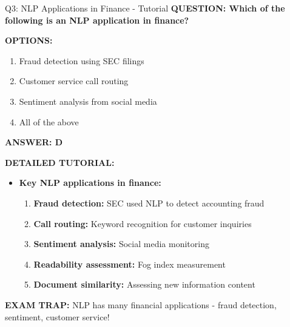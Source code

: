 \documentclass[8pt]{beamer}
\begin{document}
	\begin{frame}{Q3: NLP Applications in Finance - Tutorial}
		\fontsize{6.5}{7.5}\selectfont
		\textbf{QUESTION: Which of the following is an NLP application in finance?}
		
		\vspace{0.1cm}
		\textbf{OPTIONS:}
		\begin{enumerate}
			\item Fraud detection using SEC filings
			\item Customer service call routing
			\item Sentiment analysis from social media
			\item All of the above
		\end{enumerate}
		
		\vspace{0.1cm}
		\textcolor{myblue}{\textbf{ANSWER: D}}
		
		\vspace{0.1cm}
		\textbf{DETAILED TUTORIAL:}
		\begin{itemize}
			\item \textbf{Key NLP applications in finance:}
			\begin{enumerate}
				\item \textbf{Fraud detection:} SEC used NLP to detect accounting fraud
				\item \textbf{Call routing:} Keyword recognition for customer inquiries
				\item \textbf{Sentiment analysis:} Social media monitoring
				\item \textbf{Readability assessment:} Fog index measurement
				\item \textbf{Document similarity:} Assessing new information content
			\end{enumerate}
		\end{itemize}
		
		\textcolor{myred}{\textbf{EXAM TRAP:}} NLP has \textcolor{myblue}{many financial applications} - fraud detection, sentiment, customer service!
	\end{frame}
	
\end{document}
